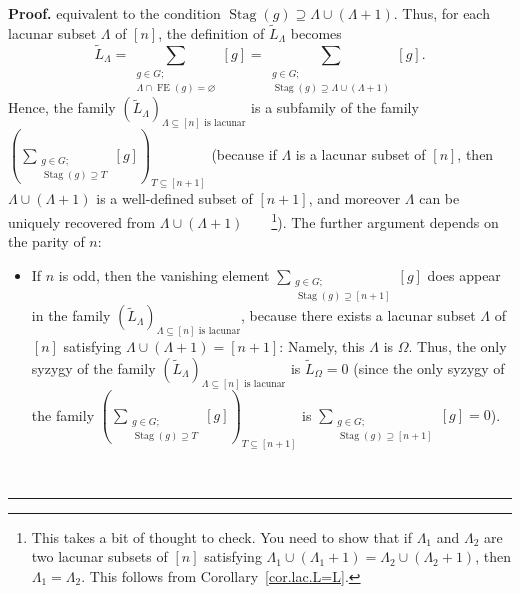 \documentclass[numbers=enddot,12pt,final,onecolumn,notitlepage]{scrartcl}%
\theoremstyle{definition}
\newenvironment{proof}[1][Proof]{\noindent\textbf{#1.} }{\ \rule{0.5em}{0.5em}}
\let\sumnonlimits\sum
\renewcommand{\sum}{\sumnonlimits\limits}
\begin{document}
\begin{proof}
equivalent to the condition $\operatorname*{Stag}\left(  g\right)
\supseteq\Lambda\cup\left(  \Lambda+1\right)  $. Thus, for each lacunar subset
$\Lambda$ of $\left[  n\right]  $, the definition of $\widetilde{L}_{\Lambda}$
becomes%
\[
\widetilde{L}_{\Lambda}=\sum_{\substack{g\in G;\\\Lambda\cap\operatorname*{FE}%
\left(  g\right)  =\varnothing}}\left[  g\right]  =\sum_{\substack{g\in
G;\\\operatorname*{Stag}\left(  g\right)  \supseteq\Lambda\cup\left(
\Lambda+1\right)  }}\left[  g\right]  .
\]
Hence, the family $\left(  \widetilde{L}_{\Lambda}\right)  _{\Lambda
\subseteq\left[  n\right]  \text{ is lacunar}}$ is a subfamily of the family
$\left(  \sum_{\substack{g\in G;\\\operatorname*{Stag}\left(  g\right)
\supseteq T}}\left[  g\right]  \right)  _{T\subseteq\left[  n+1\right]  }$
(because if $\Lambda$ is a lacunar subset of $\left[  n\right]  $, then
$\Lambda\cup\left(  \Lambda+1\right)  $ is a well-defined subset of $\left[
n+1\right]  $, and moreover $\Lambda$ can be uniquely recovered from
$\Lambda\cup\left(  \Lambda+1\right)  $\ \ \ \ \footnote{This takes a bit of
thought to check. You need to show that if $\Lambda_{1}$ and $\Lambda_{2}$ are
two lacunar subsets of $\left[  n\right]  $ satisfying $\Lambda_{1}\cup\left(
\Lambda_{1}+1\right)  =\Lambda_{2}\cup\left(  \Lambda_{2}+1\right)  $, then
$\Lambda_{1}=\Lambda_{2}$. This follows from
Corollary~\ref{cor.lac.L=L}.}). The further
argument depends on the parity of $n$:

\begin{itemize}
\item If $n$ is odd, then the vanishing element $\sum_{\substack{g\in
G;\\\operatorname*{Stag}\left(  g\right)  \supseteq\left[  n+1\right]
}}\left[  g\right]  $ does appear in the family $\left(  \widetilde{L}%
_{\Lambda}\right)  _{\Lambda\subseteq\left[  n\right]  \text{ is lacunar}}$,
because there exists a lacunar subset $\Lambda$ of $\left[  n\right]  $
satisfying $\Lambda\cup\left(  \Lambda+1\right)  =\left[  n+1\right]  $:
Namely, this $\Lambda$ is $\Omega$. Thus, the only syzygy of the family
$\left(  \widetilde{L}_{\Lambda}\right)  _{\Lambda\subseteq\left[  n\right]
\text{ is lacunar}}$ is $\widetilde{L}_{\Omega}=0$ (since the only syzygy of
the family $\left(  \sum_{\substack{g\in G;\\\operatorname*{Stag}\left(
g\right)  \supseteq T}}\left[  g\right]  \right)  _{T\subseteq\left[
n+1\right]  }$ is $\sum_{\substack{g\in G;\\\operatorname*{Stag}\left(
g\right)  \supseteq\left[  n+1\right]  }}\left[  g\right]  =0$).


\end{itemize}
\end{proof}
\end{document}
